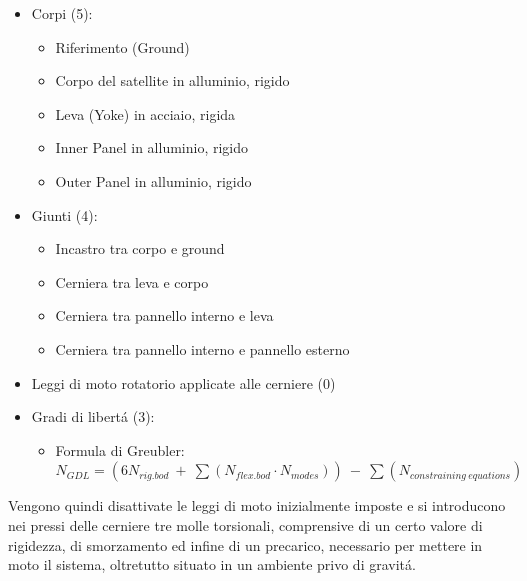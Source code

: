 \documentclass{article}
\begin{document}
        \begin{itemize}
            \item Corpi (5):
            \begin{itemize}
                \item Riferimento (Ground) 
                \item Corpo del satellite in alluminio, rigido
                \item Leva (Yoke) in acciaio, rigida
                \item Inner Panel in alluminio, rigido
                \item Outer Panel in alluminio, rigido
            \end{itemize}
            \item Giunti (4):
            \begin{itemize}
                \item Incastro tra corpo e ground
                \item Cerniera tra leva e corpo
                \item Cerniera tra pannello interno e leva
                \item Cerniera tra pannello interno e pannello esterno
            \end{itemize}
            \item Leggi di moto rotatorio applicate alle cerniere (0)
            \item Gradi di libertá (3):
            \begin{itemize}
                \item Formula di Greubler: \\ 
                $N_{GDL} = (6N_{rig.bod} \ + \ \sum (N_{flex.bod} \cdot N_{modes})) \ - \ \sum (N_{constraining \ equations}) $
            \end{itemize}
        \end{itemize}

        Vengono quindi disattivate le leggi di moto inizialmente imposte e si introducono nei pressi delle cerniere
        tre molle torsionali, comprensive di un certo valore di rigidezza, di smorzamento ed infine di un 
        precarico, necessario per mettere in moto il sistema, oltretutto situato in un ambiente privo di gravitá.
        \clearpage 
\end{document}

